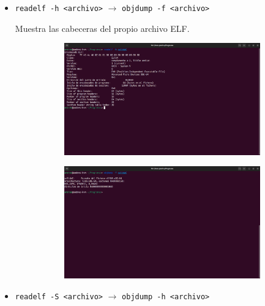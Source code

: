 \documentclass{article}
\begin{document}
\begin{itemize}
    \item \verb|readelf -h <archivo>| $\rightarrow$ \verb|objdump -f <archivo>|
    
    Muestra las cabeceras del propio archivo ELF.

    \begin{figure}[H]
        \centering
        \begin{subfigure}{0.49\textwidth}
            \centering
            \includegraphics[width=\textwidth]{imagenes/Captura desde 2022-11-17 17-44-04.png}
        \end{subfigure}
        \hfill
        \begin{subfigure}{0.49\textwidth}
            \centering
            \includegraphics[width=\textwidth]{imagenes/Captura desde 2022-11-17 17-44-19.png}
        \end{subfigure}
    \end{figure}

    \item \verb|readelf -S <archivo>| $\rightarrow$ \verb|objdump -h <archivo>|
    

\end{itemize}
\end{document}
